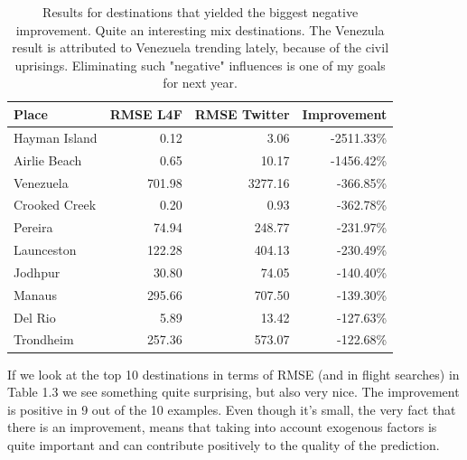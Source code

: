 \documentclass[minf,frontabs,twoside,singlespacing,parskip]{infthesis}
\begin{document}
\begin{table}[h!]
\begin{center}
\begin{tabular}{ l | r | r | r}
Place & RMSE L4F & RMSE Twitter & Improvement \\
\hline
Hayman Island & 0.12 & 3.06 & -2511.33\% \\
Airlie Beach & 0.65 & 10.17 & -1456.42\% \\
Venezuela & 701.98 & 3277.16 & -366.85\% \\
Crooked Creek & 0.20 & 0.93 & -362.78\% \\
Pereira & 74.94 & 248.77 & -231.97\% \\
Launceston & 122.28 & 404.13 & -230.49\% \\
Jodhpur & 30.80 & 74.05 & -140.40\% \\
Manaus & 295.66 & 707.50 & -139.30\% \\
Del Rio & 5.89 & 13.42 & -127.63\% \\
Trondheim & 257.36 & 573.07 & -122.68\%
\end{tabular}
\end{center}
\caption{Results for destinations that yielded the biggest negative improvement. Quite an interesting mix destinations. The Venezula result is attributed to Venezuela trending lately, because of the civil uprisings. Eliminating such "negative" influences is one of my goals for next year.}
\end{table}


If we look at the top 10 destinations in terms of RMSE (and in flight searches) in Table 1.3 we see something quite surprising, but also very nice. The improvement is positive in 9 out of the 10 examples. Even though it's small, the very fact that there is an improvement, means that taking into account exogenous factors is quite important and can contribute positively to the quality of the prediction.
\end{document}
